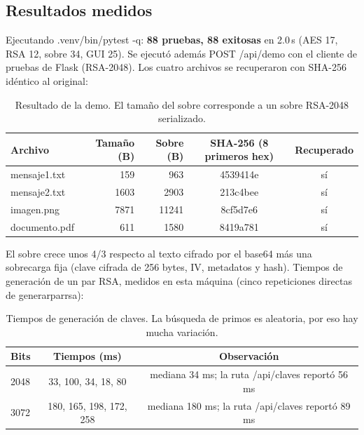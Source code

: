 \documentclass[11pt,a4paper]{article}
\newcommand{\cod}[1]{{\ttfamily\let\_\relax\def\_{\textunderscore\penalty0\hskip0pt\relax}\def\/{\slash\penalty0\hskip0pt\relax}#1}}
\begin{document}
\subsection{Resultados medidos}
Ejecutando \cod{.venv/bin/pytest -q}: \textbf{88 pruebas, 88 exitosas} en 2.0\,s (AES 17, RSA 12, sobre 34,
GUI 25). Se ejecutó además \cod{POST /api/demo} con el cliente de pruebas de Flask (RSA-2048). Los cuatro
archivos se recuperaron con SHA-256 idéntico al original:
\begin{table}[H]
\centering\small
\begin{tabular}{@{}lrrcc@{}}
\toprule
Archivo & Tamaño (B) & Sobre (B) & SHA-256 (8 primeros hex) & Recuperado \\ \midrule
\cod{mensaje1.txt} & 159 & 963 & \cod{4539414e} & sí \\
\cod{mensaje2.txt} & 1603 & 2903 & \cod{213c4bee} & sí \\
\cod{imagen.png} & 7871 & 11241 & \cod{8cf5d7e6} & sí \\
\cod{documento.pdf} & 611 & 1580 & \cod{8419a781} & sí \\ \bottomrule
\end{tabular}
\caption{Resultado de la demo. El tamaño del sobre corresponde a un sobre RSA-2048 serializado.}
\end{table}
El sobre crece unos 4/3 respecto al texto cifrado por el base64 más una sobrecarga fija
(clave cifrada de 256 bytes, IV, metadatos y hash). Tiempos de generación de un par RSA, medidos en esta
máquina (cinco repeticiones directas de \cod{generar\_par\_rsa}):
\begin{table}[H]
\centering
\begin{tabular}{@{}lcc@{}}
\toprule
Bits & Tiempos (ms) & Observación \\ \midrule
2048 & 33, 100, 34, 18, 80 & mediana 34 ms; la ruta \cod{/api/claves} reportó 56 ms \\
3072 & 180, 165, 198, 172, 258 & mediana 180 ms; la ruta \cod{/api/claves} reportó 89 ms \\ \bottomrule
\end{tabular}
\caption{Tiempos de generación de claves. La búsqueda de primos es aleatoria, por eso hay mucha variación.}
\end{table}
\end{document}
